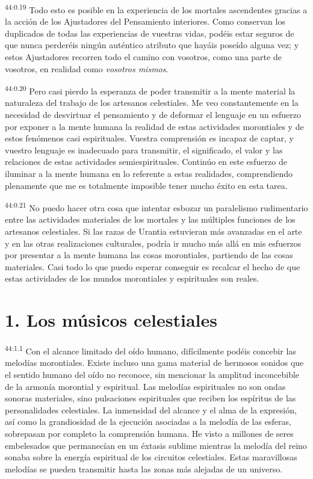 \par
\textsuperscript{44:0.19} Todo esto es posible en la experiencia de los mortales ascendentes gracias a la acción de los Ajustadores del Pensamiento interiores. Como conservan los duplicados de todas las experiencias de vuestras vidas, podéis estar seguros de que nunca perderéis ningún auténtico atributo que hayáis poseído alguna vez; y estos Ajustadores recorren todo el camino con vosotros, como una parte de vosotros, en realidad como \textit{vosotros mismos}.

\par
\textsuperscript{44:0.20} Pero casi pierdo la esperanza de poder transmitir a la mente material la naturaleza del trabajo de los artesanos celestiales. Me veo constantemente en la necesidad de desvirtuar el pensamiento y de deformar el lenguaje en un esfuerzo por exponer a la mente humana la realidad de estas actividades morontiales y de estos fenómenos casi espirituales. Vuestra comprensión es incapaz de captar, y vuestro lenguaje es inadecuado para transmitir, el significado, el valor y las relaciones de estas actividades semiespirituales. Continúo en este esfuerzo de iluminar a la mente humana en lo referente a estas realidades, comprendiendo plenamente que me es totalmente imposible tener mucho éxito en esta tarea.

\par
\textsuperscript{44:0.21} No puedo hacer otra cosa que intentar esbozar un paralelismo rudimentario entre las actividades materiales de los mortales y las múltiples funciones de los artesanos celestiales. Si las razas de Urantia estuvieran más avanzadas en el arte y en las otras realizaciones culturales, podría ir mucho más allá en mis esfuerzos por presentar a la mente humana las cosas morontiales, partiendo de las cosas materiales. Casi todo lo que puedo esperar conseguir es recalcar el hecho de que estas actividades de los mundos morontiales y espirituales son reales.

\section*{1. Los músicos celestiales}
\par
\textsuperscript{44:1.1} Con el alcance limitado del oído humano, difícilmente podéis concebir las melodías morontiales. Existe incluso una gama material de hermosos sonidos que el sentido humano del oído no reconoce, sin mencionar la amplitud inconcebible de la armonía morontial y espiritual. Las melodías espirituales no son ondas sonoras materiales, sino pulsaciones espirituales que reciben los espíritus de las personalidades celestiales. La inmensidad del alcance y el alma de la expresión, así como la grandiosidad de la ejecución asociadas a la melodía de las esferas, sobrepasan por completo la comprensión humana. He visto a millones de seres embelesados que permanecían en un éxtasis sublime mientras la melodía del reino sonaba sobre la energía espiritual de los circuitos celestiales. Estas maravillosas melodías se pueden transmitir hasta las zonas más alejadas de un universo.

